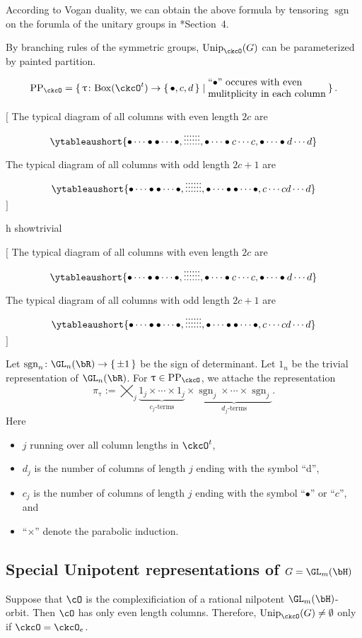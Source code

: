 \documentclass[12pt,a4paper]{amsart}
\let\ytb=\ytableaushort
\newcommand{\trivial}[2][]{\if\relax\detokenize{#1}\relax
  {%
      \color{orange} \vspace{0em} $[$  #2 $]$
      \color{black}
  }
  \else
\ifx#1h
\ifcsname showtrivial\endcsname
{%
    \color{orange} \vspace{0em}  $[$ #2 $]$
    \color{black}
}
\fi
\else {\red Wrong argument!} \fi
\fi
}
\newcommand{\sgn}{\operatorname{sgn}}
\numberwithin{equation}{section}
\theoremstyle{remark}
\def\Unip{\mathrm{Unip}}
\begin{document}
According to Vogan duality,  we can obtain the above formula by tensoring $\sgn$
on the forumla of the unitary groups in \cite{BV.W}*{Section~4}.

By branching rules of the symmetric groups,  $\Unip_{\ckcO}(G)$ can be parameterized by painted partition. 

\[
\PP{\ckcO} = \set{\uptau\colon \BOX{\ckcO^t}\rightarrow \set{\bullet,c,d}|
  \begin{minipage}{12em} ``$\bullet$'' occures with even\\ mulitplicity in each column
  \end{minipage}
}.  
\]
\trivial{
The typical diagram of all columns with even length $2c$ are
\[
\ytb{\bullet\cdots\bullet\bullet\cdots\bullet,\vdots\vdots\vdots\vdots\vdots\vdots,
\bullet\cdots\bullet c\cdots c,
\bullet\cdots\bullet d\cdots d
}  
\]

The typical diagram of all columns with odd length $2c+1$ are
\[
\ytb{\bullet\cdots\bullet\bullet\cdots\bullet,\vdots\vdots\vdots\vdots\vdots\vdots,
\bullet\cdots\bullet \bullet\cdots\bullet ,
c\cdots c d\cdots d
}  
\]
}

Let $\sgn_n\colon \GL_n(\bR)\rightarrow \set{\pm 1}$ be the sign of determinant. 
Let $1_n$ be the trivial representation of $\GL_n(\bR)$. 
For $\uptau\in \PP{\ckcO}$, we attache the representation 
\begin{equation}\label{eq:u.GLR}
\pi_\uptau := 
\bigtimes_{j} \underbrace{1_j \times \cdots \times 1_j}_{c_j\text{-terms}}\times
\underbrace{\sgn_j \times \cdots \times {\sgn_j} }_{d_j\text{-terms}}.
\end{equation}
Here 
\begin{itemize}
  \item 
$j$ running over all column lengths in $\ckcO^t$, 
\item $d_j$ is the number of
columns of length $j$ ending with the symbol ``d'',
\item  $c_j$ is the number of
columns of length $j$ ending with the symbol ``$\bullet$'' or ``$c$'', and 
\item  ``$\times$'' denote the parabolic induction.  
\end{itemize}

\subsection{Special Unipotent representations of $G=\GL_{m}(\bH)$}

Suppose that $\cO$ is the complexificiation of a rational nilpotent $\GL_{m}(\bH)$-orbit. 
Then $\cO$ has only even length columns. 
Therefore, $\Unip_\ckcO(G) \neq\emptyset$ only if $\ckcO = \ckcO_e$. 
\end{document}

